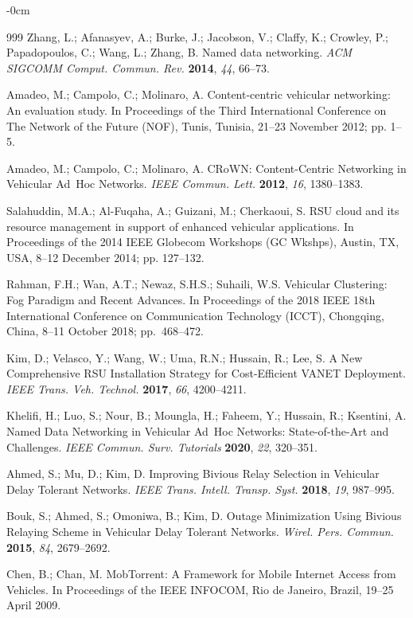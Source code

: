 \documentclass[electronics,aricle,accept,pdftex,moreauthors]{Definitions/mdpi}
\begin{document}
\begin{adjustwidth}{-\extralength}{0cm}
\begin{thebibliography}{999}
 Zhang, L.; Afanasyev, A.; Burke, J.; Jacobson, V.; Claffy, K.; Crowley, P.; Papadopoulos, C.; Wang, L.; Zhang, B. Named data networking. \textit{ACM SIGCOMM Comput. Commun. Rev.} \textbf{2014}, \emph{44}, 66–73.

 Amadeo, M.; Campolo, C.; Molinaro, A. Content-centric vehicular networking: An evaluation study. In Proceedings of the {Third International Conference on The Network of the Future (NOF)}, Tunis, Tunisia, 21--23 November 2012; pp. 1--5.

 Amadeo, M.; Campolo, C.; Molinaro, A. CRoWN: Content-Centric Networking in Vehicular Ad~Hoc Networks. \textit{IEEE Commun. Lett.} \textbf{2012}, \emph{16}, 1380--1383.

 Salahuddin, M.A.; Al-Fuqaha, A.; Guizani, M.; Cherkaoui, S. RSU cloud and its resource management in support of enhanced vehicular applications. In Proceedings of the {2014 IEEE Globecom Workshops (GC Wkshps)}, Austin, TX, USA, 8--12 December 2014; pp. 127--132.

 Rahman, F.H.; Wan, A.T.; Newaz, S.H.S.; Suhaili, W.S. Vehicular Clustering: Fog Paradigm and Recent Advances. In Proceedings of the {2018 IEEE 18th International Conference on Communication Technology (ICCT)}, Chongqing, China, 8--11 October 2018; pp.~468--472.

 Kim, D.; Velasco, Y.; Wang, W.; Uma, R.N.; Hussain, R.; Lee, S. A New Comprehensive RSU Installation Strategy for Cost-Efficient VANET Deployment. \textit{IEEE Trans. Veh. Technol.} \textbf{2017}, \emph{66}, 4200--4211.

 Khelifi, H.; Luo, S.; Nour, B.; Moungla, H.; Faheem, Y.; Hussain, R.; Ksentini, A. Named Data Networking in Vehicular Ad~Hoc Networks: State-of-the-Art and Challenges. \textit{IEEE Commun. Surv. Tutorials} \textbf{2020}, \emph{22}, 320--351.

 Ahmed, S.; Mu, D.; Kim, D. Improving Bivious Relay Selection in Vehicular Delay Tolerant Networks. \textit{IEEE Trans. Intell. Transp. Syst.} \textbf{2018}, \emph{19}, 987--995.

 Bouk, S.; Ahmed, S.; Omoniwa, B.; Kim, D. Outage Minimization Using Bivious Relaying Scheme in Vehicular Delay Tolerant Networks. \textit{Wirel. Pers. Commun.} \textbf{2015}, \emph{84}, 2679–2692.

 Chen, B.; Chan, M. MobTorrent: A Framework for Mobile Internet Access from Vehicles. In Proceedings of the {IEEE INFOCOM}, Rio de Janeiro, Brazil, 19--25 April 2009.


\end{thebibliography}
\end{adjustwidth}
\end{document}
